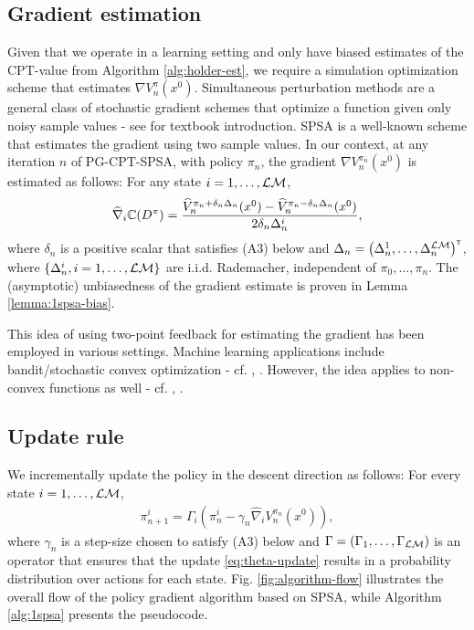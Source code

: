 \documentclass[11pt,letterpaper,english]{article}
\begin{document}
\subsection{Gradient estimation} 
Given that we operate in a learning setting and only have biased estimates of the CPT-value from Algorithm \ref{alg:holder-est}, we require a simulation optimization scheme that estimates $\nabla V_n^\pi(x^0)$.  
Simultaneous perturbation methods are a general class of stochastic gradient schemes that optimize a function given only noisy sample values - see \cite{Bhatnagar13SR} for textbook introduction. SPSA is a well-known scheme that estimates the gradient using two sample values. In our context, at any iteration $n$ of PG-CPT-SPSA, with policy $\pi_n$, the gradient $\nabla V_n^{\pi_n}(x^0)$ is estimated as follows: For any state $i=1,\ldots,\mathcal{L}\mathcal{M}$,
$$\widehat \nabla_{i} \mathbb{C}(D^\pi) = \dfrac{\widehat V_n^{\pi_n+\delta_n \Delta_n}(x^0) - \widehat V_n^{\pi_n-\delta_n \Delta_n}(x^0)}{2 \delta_n \Delta_n^{i}},$$
where $\delta_n$ is a positive scalar that satisfies (A3) below and $\Delta_n = \left( \Delta_n^{1},\ldots,\Delta_n^{\mathcal{L}\mathcal{M}}\right)^\mathsf{\scriptscriptstyle T}$, where $\{\Delta_n^{i}, i=1,\ldots,\mathcal{L}\mathcal{M}\}$ are i.i.d. Rademacher, independent of $\pi_0,\ldots,\pi_n$.
The (asymptotic) unbiasedness of the gradient estimate is proven in Lemma \ref{lemma:1spsa-bias}.

This idea of using two-point feedback for estimating the gradient has been employed in various settings. Machine learning applications include bandit/stochastic convex optimization - cf. 
\cite{hazan2015online}, \cite{duchi2013optimal}. However, the idea applies to non-convex functions as well - cf. \cite{spall2005introduction}, \cite{Bhatnagar13SR}.


\subsection{Update rule} We incrementally update the policy in the descent direction as follows: For every state $i=1,\ldots,\mathcal{L}\mathcal{M}$,
\begin{align}
\pi^{i}_{n+1} = \Gamma_{i}\left(\pi^{i}_n - \gamma_n \widehat \nabla_{i} V_n^{\pi_n}(x^0)\right),
\label{eq:theta-update}
\end{align}
where  $\gamma_n$ is a step-size chosen to satisfy (A3) below and
$\Gamma=\left(\Gamma_{1},\ldots,\Gamma_{\mathcal{L}\mathcal{M}}\right)$ is an operator that ensures that the update \eqref{eq:theta-update} results in a probability distribution over actions for each state. 
Fig. \ref{fig:algorithm-flow} illustrates the overall flow of the policy gradient algorithm based on SPSA, while Algorithm \ref{alg:1spsa}  presents the pseudocode.  
\end{document}
